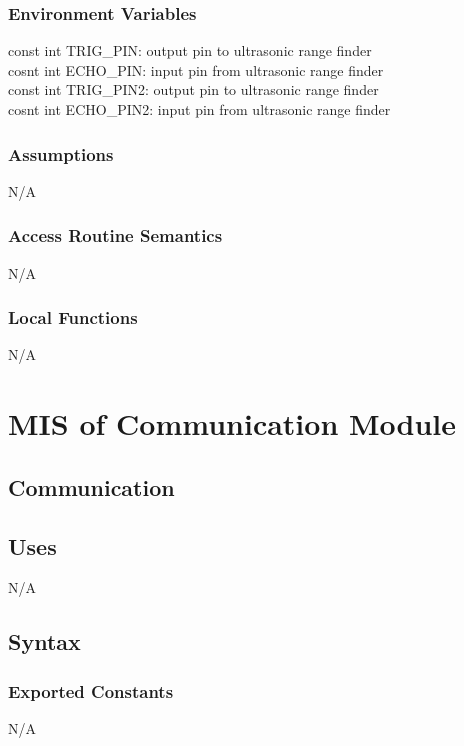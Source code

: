 \documentclass[12pt, titlepage]{article}
\begin{document}
\subsubsection{Environment Variables}

const int TRIG\_PIN: output pin to ultrasonic range finder\\
cosnt int ECHO\_PIN: input pin from ultrasonic range finder\\
const int TRIG\_PIN2: output pin to ultrasonic range finder\\
cosnt int ECHO\_PIN2: input pin from ultrasonic range finder\\

\subsubsection{Assumptions}

N/A

\subsubsection{Access Routine Semantics}

N/A

\subsubsection{Local Functions}

N/A
\section{MIS of Communication Module} \label{communication}

\subsection{Communication}

\subsection{Uses}

N/A
\subsection{Syntax}

\subsubsection{Exported Constants}
N/A
\end{document}
